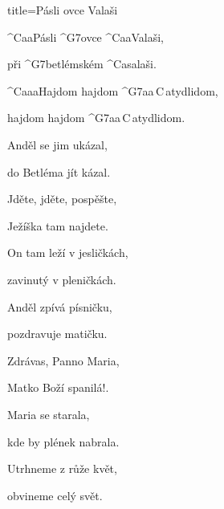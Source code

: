 \begin{song}{title=\predtitle\centering Pásli ovce Valaši \\\large   \vspace*{-0.3cm}}  %
\begin{centerjustified}
\nejvetsi

\begin{varwidth}[t]{0.57\textwidth}\setlength{\parindent}{0.45cm}  %

\sloka
	^{C{\color{white}aa}}Pásli ^{G7}ovce ^{C{\color{white}aa}}Valaši,

	při ^{G7}betlémském ^{C{\color{white}a}}salaši.

	^{C{\color{white}aaa}}Hajdom hajdom ^{G7{\color{white}aa}\,C\,{\color{white}a}}tydlidom,

	hajdom hajdom ^{G7{\color{white}aa}\,C\,{\color{white}a}}tydlidom.

\sloka
	Anděl se jim ukázal,

	do Betléma jít kázal.


\sloka
	Jděte, jděte, pospěšte,

	Ježíška tam najdete.


\sloka
	On tam leží v jesličkách,

	zavinutý v pleničkách.


\sloka
	Anděl zpívá písničku,

	pozdravuje matičku.



\sloka
	Zdrávas, Panno Maria,

	Matko Boží spanilá!.

\end{varwidth}\mezisloupci\begin{varwidth}[t]{0.55\textwidth}\setlength{\parindent}{0.45cm}
\vspace*{0.4525cm}  %


\sloka
	Maria se starala,

	kde by plének nabrala.


\sloka
	Utrhneme z růže květ,

	obvineme celý svět.


\end{varwidth}

\end{centerjustified}

\setcounter{Slokočet}{0}
\end{song}

